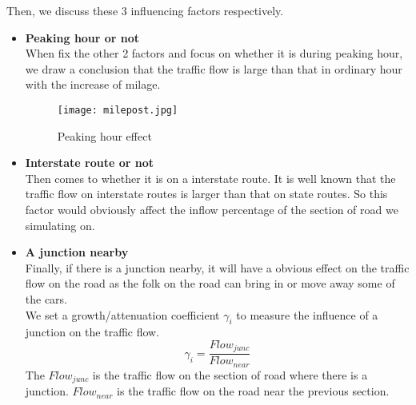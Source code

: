 \documentclass{mcmthesis}
\numberwithin{equation}{section}
\begin{document}
					Then, we discuss these 3 influencing factors respectively. 
					\begin{itemize}
						\item \textbf{Peaking hour or not}\\
							When fix the other 2 factors and focus on whether it is during peaking hour, we draw a conclusion that the traffic flow is large than that in ordinary hour with the increase of milage. 
							\begin{figure}[H]
								\begin{center}
									\texttt{[image: milepost.jpg]}
									\caption{Peaking hour effect}
								\end{center}
							\end{figure}
						\item \textbf{Interstate route or not}\\
							Then comes to whether it is on a interstate route. It is well known that the traffic flow on interstate routes is larger than that on state routes. So this factor would obviously affect the inflow percentage of the section of road we simulating on.
						\item \textbf{A junction nearby}\\
							Finally, if there is a junction nearby, it will have a obvious effect on the traffic flow on the road as the folk on the road can bring in or move away some of the cars. \\
							We set a growth/attenuation coefficient $\gamma_{i}$ to measure the influence of a junction on the traffic flow.
							\begin{equation}
								\gamma_{i}=\frac{Flow_{junc}}{Flow_{near}}
							\end{equation}
							The $Flow_{junc}$ is the traffic flow on the section of road where there is a junction. $Flow_{near}$ is the traffic flow on the road near the previous section.


\end{itemize}
\end{document}
